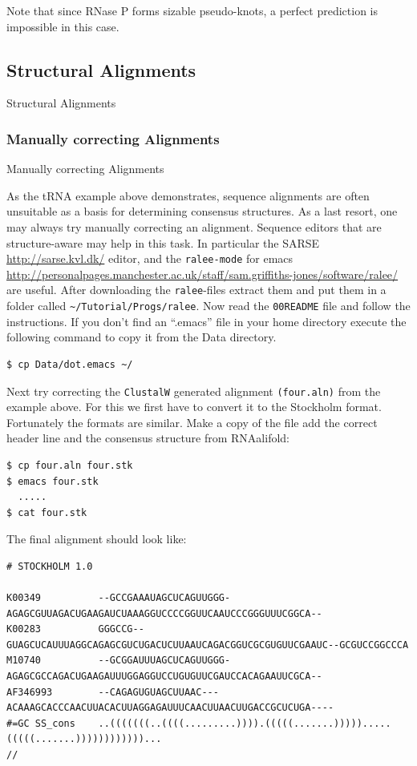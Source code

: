 \documentclass[]{article}
\begin{document}
Note that since RNase P forms sizable pseudo-knots, a perfect prediction
is impossible in this case.

\subsection{Structural Alignments}{Structural Alignments}\label{structural-alignments}

\subsubsection{Manually correcting Alignments}{Manually correcting Alignments}\label{manually-correcting-alignments}

As the tRNA example above demonstrates, sequence alignments are often
unsuitable as a basis for determining consensus structures. As a last
resort, one may always try manually correcting an alignment. Sequence
editors that are structure-aware may help in this task. In particular
the SARSE \url{http://sarse.kvl.dk/} editor, and the \texttt{ralee-mode}
for emacs
\url{http://personalpages.manchester.ac.uk/staff/sam.griffiths-jones/software/ralee/}
are useful. After downloading the \texttt{ralee}-files extract them and
put them in a folder called
\texttt{\textasciitilde{}/Tutorial/Progs/ralee}. Now read the
\texttt{00README} file and follow the instructions. If you don't find an
``.emacs'' file in your home directory execute the following command to
copy it from the Data directory.\\

\begin{verbatim}
$ cp Data/dot.emacs ~/
\end{verbatim}

Next try correcting the \texttt{ClustalW} generated alignment
\texttt{(four.aln)} from the example above. For this we first have to
convert it to the Stockholm format. Fortunately the formats are similar.
Make a copy of the file add the correct header line and the consensus
structure from RNAalifold:

\begin{verbatim}
$ cp four.aln four.stk
$ emacs four.stk
  .....
$ cat four.stk
\end{verbatim}

The final alignment should look like:

\begin{verbatim}
# STOCKHOLM 1.0

K00349          --GCCGAAAUAGCUCAGUUGGG-AGAGCGUUAGACUGAAGAUCUAAAGGUCCCCGGUUCAAUCCCGGGUUUCGGCA--
K00283          GGGCCG--GUAGCUCAUUUAGGCAGAGCGUCUGACUCUUAAUCAGACGGUCGCGUGUUCGAAUC--GCGUCCGGCCCA
M10740          --GCGGAUUUAGCUCAGUUGGG-AGAGCGCCAGACUGAAGAUUUGGAGGUCCUGUGUUCGAUCCACAGAAUUCGCA--
AF346993        --CAGAGUGUAGCUUAAC---ACAAAGCACCCAACUUACACUUAGGAGAUUUCAACUUAACUUGACCGCUCUGA----
#=GC SS_cons    ..(((((((..((((.........)))).(((((.......))))).....(((((.......))))))))))))...
//
\end{verbatim}
\end{document}

